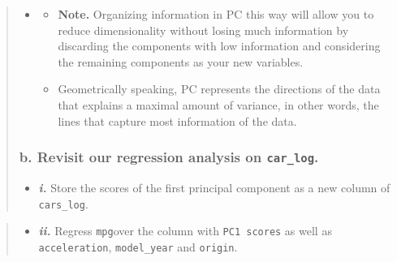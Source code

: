 \documentclass[
]{article}
\newenvironment{Shaded}{\begin{snugshade}}{\end{snugshade}}
\newcommand{\NormalTok}[1]{#1}
\newcommand{\OtherTok}[1]{\textcolor[rgb]{0.56,0.35,0.01}{#1}}
\newcommand{\SpecialCharTok}[1]{\textcolor[rgb]{0.00,0.00,0.00}{#1}}
\newcommand{\StringTok}[1]{\textcolor[rgb]{0.31,0.60,0.02}{#1}}
\providecommand{\tightlist}{%
  \setlength{\itemsep}{0pt}\setlength{\parskip}{0pt}}
\begin{document}
\begin{quote}
\begin{itemize}
\item
  \begin{itemize}
  \item
    \textbf{Note.} Organizing information in PC this way will allow you
    to reduce dimensionality without losing much information by
    discarding the components with low information and considering the
    remaining components as your new variables.
  \item
    Geometrically speaking, PC represents the directions of the data
    that explains a maximal amount of variance, in other words, the
    lines that capture most information of the data.
  \end{itemize}
\end{itemize}

\hypertarget{b.-revisit-our-regression-analysis-on-car_log.}{%
\subsubsection{\texorpdfstring{b. Revisit our regression analysis on
\texttt{car\_log}.}{b. Revisit our regression analysis on car\_log.}}\label{b.-revisit-our-regression-analysis-on-car_log.}}

\begin{itemize}
\tightlist
\item
  \textbf{\emph{i.}} Store the scores of the first principal component
  as a new column of \texttt{cars\_log}.
\end{itemize}
\end{quote}

\begin{Shaded}
\end{Shaded}

\begin{quote}
\begin{itemize}
\tightlist
\item
  \textbf{\emph{ii.}} Regress \texttt{mpg}over the column with
  \texttt{PC1\ scores} as well as \texttt{acceleration},
  \texttt{model\_year} and \texttt{origin}.
\end{itemize}
\end{quote}
\end{document}
